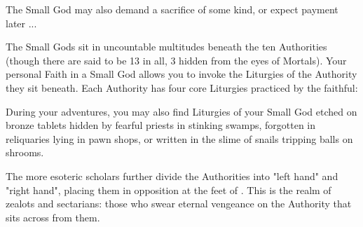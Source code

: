 The Small God may also demand a sacrifice of some kind, or expect payment later ...






\newpage


The Small Gods sit in uncountable multitudes beneath the ten Authorities (though there are said to be 13 in all, 3 hidden from the eyes of Mortals). Your personal Faith in a Small God allows you to invoke the Liturgies of the Authority they sit beneath. Each Authority has four core Liturgies practiced by the faithful: 



During your adventures, you may also find Liturgies of your Small God etched on bronze tablets hidden by fearful priests in stinking swamps, forgotten in reliquaries lying in pawn shops, or written in the slime of snails tripping balls on shrooms.  


The more esoteric scholars further divide the Authorities into "left hand" and "right hand", placing them in opposition at the feet of \TheAuthority.  This is the realm of zealots and sectarians: those who swear eternal vengeance on the Authority that sits across from them.




